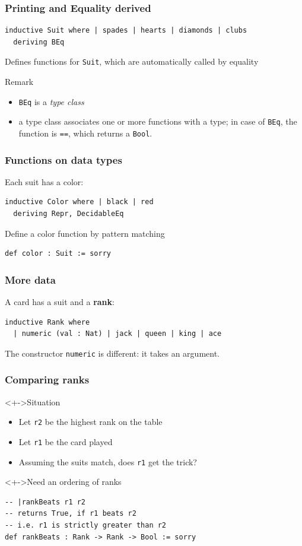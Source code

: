 \documentclass{beamer}
\begin{document}
\begin{frame}
  \frametitle{Printing and Equality derived}
\begin{lstlisting}
inductive Suit where | spades | hearts | diamonds | clubs
  deriving BEq
\end{lstlisting}
Defines functions for \lstinline{Suit}, which are
automatically called by equality
\begin{exampleblock}{Remark}
  \begin{itemize}
  \item \lstinline{BEq} is a \emph{type class}
  \item a type class associates one or more functions with a type; in
    case of \lstinline{BEq}, the function is \lstinline{==}, which returns a \lstinline{Bool}.
  \end{itemize}
\end{exampleblock}
\end{frame}
\begin{frame}
  \frametitle{Functions on data types}
   Each suit has a color:
\begin{lstlisting}
inductive Color where | black | red
  deriving Repr, DecidableEq
\end{lstlisting}
   Define a color function by pattern matching
\begin{lstlisting}
def color : Suit := sorry
\end{lstlisting}
\end{frame}
\begin{frame}
  \frametitle{More data}
  A card has a suit and a \textbf{rank}:
\begin{lstlisting}
inductive Rank where
  | numeric (val : Nat) | jack | queen | king | ace
\end{lstlisting}
The constructor \lstinline{numeric} is different: it takes an argument.
\end{frame}
\begin{frame}[fragile]
  \frametitle{Comparing ranks}
  \begin{block}<+->{Situation}
    \begin{itemize}
    \item Let \texttt{r2} be the highest rank on the table
    \item Let \texttt{r1} be the card played
    \item Assuming the suits match, does \texttt{r1} get the trick?
    \end{itemize}
  \end{block}
  \begin{block}<+->{Need an ordering of ranks}
\begin{lstlisting}
-- |rankBeats r1 r2
-- returns True, if r1 beats r2
-- i.e. r1 is strictly greater than r2
def rankBeats : Rank -> Rank -> Bool := sorry
\end{lstlisting}
  \end{block}
\end{frame}
\end{document}
